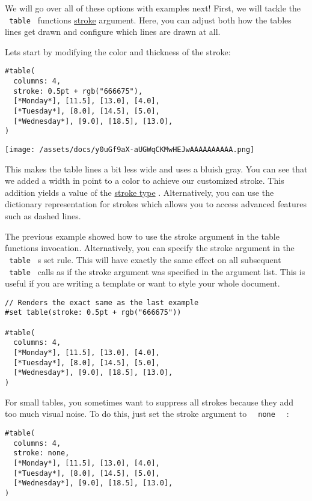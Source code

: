 We will go over all of these options with examples next! First, we will
tackle the \texttt{\ table\ } function\textquotesingle s
\href{/docs/reference/model/table/\#parameters-stroke}{stroke} argument.
Here, you can adjust both how the table\textquotesingle s lines get
drawn and configure which lines are drawn at all.

Let\textquotesingle s start by modifying the color and thickness of the
stroke:

\begin{verbatim}
#table(
  columns: 4,
  stroke: 0.5pt + rgb("666675"),
  [*Monday*], [11.5], [13.0], [4.0],
  [*Tuesday*], [8.0], [14.5], [5.0],
  [*Wednesday*], [9.0], [18.5], [13.0],
)
\end{verbatim}

\texttt{[image: /assets/docs/y0uGf9aX-aUGWqCKMwHEJwAAAAAAAAAA.png]}

This makes the table lines a bit less wide and uses a bluish gray. You
can see that we added a width in point to a color to achieve our
customized stroke. This addition yields a value of the
\href{/docs/reference/visualize/stroke/}{stroke type} . Alternatively,
you can use the dictionary representation for strokes which allows you
to access advanced features such as dashed lines.

The previous example showed how to use the stroke argument in the table
function\textquotesingle s invocation. Alternatively, you can specify
the stroke argument in the \texttt{\ table\ } \textquotesingle s set
rule. This will have exactly the same effect on all subsequent
\texttt{\ table\ } calls as if the stroke argument was specified in the
argument list. This is useful if you are writing a template or want to
style your whole document.

\begin{verbatim}
// Renders the exact same as the last example
#set table(stroke: 0.5pt + rgb("666675"))

#table(
  columns: 4,
  [*Monday*], [11.5], [13.0], [4.0],
  [*Tuesday*], [8.0], [14.5], [5.0],
  [*Wednesday*], [9.0], [18.5], [13.0],
)
\end{verbatim}

For small tables, you sometimes want to suppress all strokes because
they add too much visual noise. To do this, just set the stroke argument
to \texttt{\ }{\texttt{\ none\ }}\texttt{\ } :

\begin{verbatim}
#table(
  columns: 4,
  stroke: none,
  [*Monday*], [11.5], [13.0], [4.0],
  [*Tuesday*], [8.0], [14.5], [5.0],
  [*Wednesday*], [9.0], [18.5], [13.0],
)
\end{verbatim}

